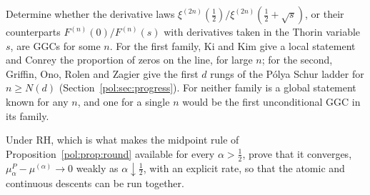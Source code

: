 \begin{problem}\label{pol:op:deriv}
Determine whether the derivative laws $\xi^{(2n)}(\frac12)/\xi^{(2n)}(\frac12+\sqrt s)$, or their counterparts $F^{(n)}(0)/F^{(n)}(s)$ with derivatives taken in the Thorin variable $s$, are GGCs for some $n$. For the first family, Ki and Kim give a local statement and Conrey the proportion of zeros on the line, for large $n$; for the second, Griffin, Ono, Rolen and Zagier give the first $d$ rungs of the P\'olya Schur ladder for $n\ge N(d)$ (Section~\ref{pol:sec:progress}). For neither family is a global statement known for any $n$, and one for a single $n$ would be the first unconditional GGC in its family.
\end{problem}

\begin{problem}\label{pol:op:midpoint}
Under RH, which is what makes the midpoint rule of Proposition~\ref{pol:prop:round} available for every $\alpha>\frac12$, prove that it converges, $\mu^P_\alpha-\mu^{(\alpha)}\to0$ weakly as $\alpha\downarrow\frac12$, with an explicit rate, so that the atomic and continuous descents can be run together.
\end{problem}
